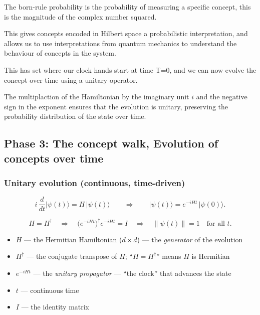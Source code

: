 \documentclass[twoside,10pt]{article}
\begin{document}
The born-rule probability is the probability of measuring a specific concept, this is the magnitude of the complex number squared.

This gives concepts encoded in Hilbert space a probabilistic interpretation, and allows us to use interpretations from quantum mechanics to understand the behaviour of concepts in the system.

This has set where our clock hands start at time T=0, and we can now evolve the concept over time using a unitary operator. 

The multiplaction of the Hamiltonian by the imaginary unit $i$ and the negative sign in the exponent ensures that the evolution is unitary, preserving the probability distribution of the state over time.

\subsection{Phase 3: The concept walk, Evolution of concepts over time}
\subsubsection{Unitary evolution (continuous, time-driven)}
\begin{equation}
  i\,\frac{d}{dt}\lvert\psi(t)\rangle = H\,\lvert\psi(t)\rangle
  \qquad\Longrightarrow\qquad
  \lvert\psi(t)\rangle = e^{-iHt}\,\lvert\psi(0)\rangle .
\end{equation}
 
\begin{equation}
  H = H^{\dagger}
  \quad\Longrightarrow\quad
  \bigl(e^{-iHt}\bigr)^{\dagger} e^{-iHt} = I
  \quad\Longrightarrow\quad
  \lVert \psi(t) \rVert = 1 \quad \text{for all } t .
\end{equation}

\begin{itemize}
  \item $H$ --- the Hermitian Hamiltonian ($d\times d$) --- the \emph{generator} of the evolution
  \item $H^{\dagger}$ --- the conjugate transpose of $H$; ``$H=H^\dagger$'' means $H$ is Hermitian
  \item $e^{-iHt}$ --- the \emph{unitary propagator} --- ``the clock'' that advances the state
  \item $t$ --- continuous time
  \item $I$ --- the identity matrix
\end{itemize}
\end{document}

